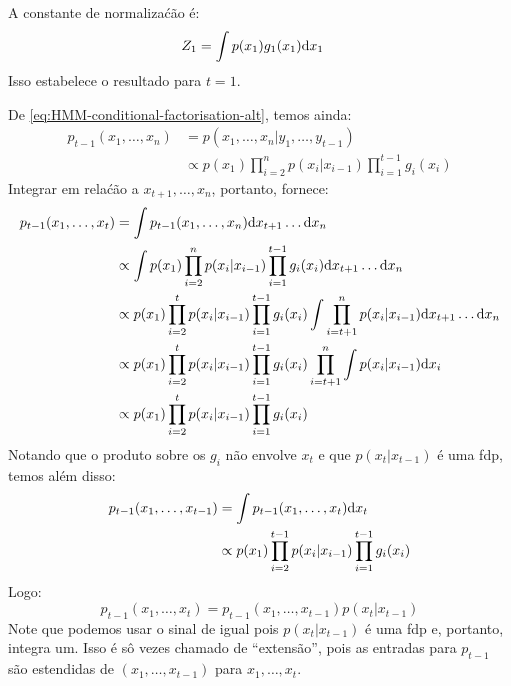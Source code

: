 \begin{exenumerate}
\begin{solution}
        A constante de normaliza\'c\~ao \'e:
        \begin{align}
            Z_1 & = \int  p(x_1) g_1(x_1) \mathrm{d} x_1
        \end{align}
        Isso estabelece o resultado para $t=1$.
        
        De \eqref{eq:HMM-conditional-factorisation-alt}, temos ainda:
        \begin{align}
            p_{t-1}(x_1, \ldots, x_n) & = p(x_1, \ldots, x_n | y_1, \ldots, y_{t-1})\\
            &\propto p(x_1) \prod_{i=2}^n p(x_i|x_{i-1}) \prod_{i=1}^{t-1} g_i(x_i)
        \end{align}
        Integrar em rela\'c\~ao a $x_{t+1}, \ldots, x_n$, portanto, fornece:
        \begin{align}
            p_{t-1}(x_1, \ldots, x_t) & = \int p_{t-1}(x_1, \ldots, x_n) \mathrm{d} x_{t+1} \ldots \mathrm{d} x_n\\
            &\propto \int p(x_1) \prod_{i=2}^n p(x_i|x_{i-1}) \prod_{i=1}^{t-1} g_i(x_i)\mathrm{d} x_{t+1} \ldots \mathrm{d} x_n\\
            & \propto  p(x_1) \prod_{i=2}^t p(x_i|x_{i-1}) \prod_{i=1}^{t-1} g_i(x_i) \int \prod_{i=t+1}^n p(x_i|x_{i-1}) \mathrm{d} x_{t+1} \ldots \mathrm{d} x_n\\
            & \propto  p(x_1) \prod_{i=2}^t p(x_i|x_{i-1}) \prod_{i=1}^{t-1} g_i(x_i) \prod_{i=t+1}^n \int p(x_i|x_{i-1}) \mathrm{d} x_i\\
            & \propto  p(x_1) \prod_{i=2}^t p(x_i|x_{i-1}) \prod_{i=1}^{t-1} g_i(x_i)
        \end{align}
        Notando que o produto sobre os $g_i$ n\~ao envolve $x_t$ e
        que $p(x_t | x_{t-1})$ \'e uma fdp, temos al\'em disso:
        \begin{align}
            p_{t-1}(x_1, \ldots, x_{t-1}) &=\int  p_{t-1}(x_1, \ldots, x_t) \mathrm{d} x_t\\
            &  \propto p(x_1) \prod_{i=2}^{t-1} p(x_i|x_{i-1}) \prod_{i=1}^{t-1} g_i(x_i)
        \end{align}
        Logo:
        \begin{equation}
            p_{t-1}(x_1, \ldots, x_t) =  p_{t-1}(x_1, \ldots, x_{t-1}) p(x_t|x_{t-1})
        \end{equation}
        Note que podemos usar o sinal de igual pois $p(x_t|x_{t-1})$ \'e uma
        fdp e, portanto, integra um. Isso \'e s\^o vezes chamado de
        ``extens\~ao'', pois as entradas para $p_{t-1}$ s\~ao estendidas de
        $(x_1, \ldots, x_{t-1})$ para $x_1, \ldots, x_t$.
        

\end{solution}
\end{exenumerate}
